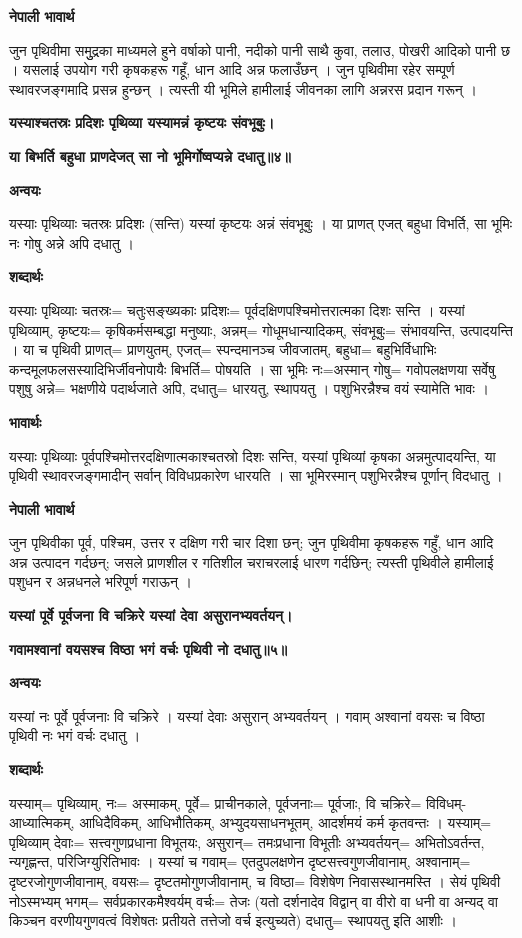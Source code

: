 \documentclass[11pt, a5paper]{article}
\begin{document}
\textbf{नेपाली भावार्थ}

जुन पृथिवीमा समुुद्रका माध्यमले हुने वर्षाको पानी, नदीको पानी साथै कुवा, तलाउ, पोखरी आदिको पानी छ । यसलाई उपयोग गरी कृषकहरू गहूँ, धान आदि अन्न फलाउँछन् । जुन पृथिवीमा रहेर सम्पूर्ण स्थावरजङ्गमादि प्रसन्न हुन्छन् । त्यस्ती यी भूमिले हामीलाई जीवनका लागि अन्नरस प्रदान गरून् ।

\textbf{यस्याश्चतस्रः प्रदिशः पृथिव्या यस्यामन्नं कृष्टयः संवभूबुः।}

\textbf{या बिभर्ति बहुधा प्राणदेजत् सा नो भूमिर्गोष्वप्यन्ने दधातु॥४॥}

\textbf{अन्वयः}

यस्याः पृथिव्याः चतस्रः प्रदिशः (सन्ति) यस्यां कृष्टयः अन्नं संवभूबुः । या प्राणत् एजत् बहुधा विभर्ति, सा भूमिः नः गोषु अन्ने अपि दधातु ।

\textbf{शब्दार्थः}

यस्याः पृथिव्याः चतस्रः= चतुःसङ्‍ख्यकाः प्रदिशः= पूर्वदक्षिणपश्चिमोत्तरात्मका दिशः सन्ति । यस्यां पृथिव्याम्, कृष्टयः= कृषिकर्मसम्बद्धा मनुष्याः, अन्नम्= गोधूमधान्यादिकम्, संवभूबुः= संभावयन्ति, उत्पादयन्ति । या च पृथिवी प्राणत्= प्राणयुतम्, एजत्= स्पन्दमानञ्च जीवजातम्, बहुधा= बहुभिर्विधाभिः कन्दमूलफलसस्यादिभिर्जीवनोपायैः बिभर्ति= पोषयति । सा भूमिः नः=अस्मान् गोषु= गवोपलक्षणया सर्वेषु पशुषु अन्ने= भक्षणीये पदार्थजाते अपि, दधातु= धारयतु, स्थापयतु । पशुभिरन्नैश्च वयं स्यामेति भावः ।

\textbf{भावार्थः}

यस्याः पृथिव्याः पूर्वपश्चिमोत्तरदक्षिणात्मकाश्चतस्रो दिशः सन्ति, यस्यां पृथिव्यां कृषका अन्नमुत्पादयन्ति, या पृथिवी स्थावरजङ्गमादीन् सर्वान् विविधप्रकारेण धारयति । सा भूमिरस्मान् पशुभिरन्नैश्च पूर्णान् विदधातु ।

\textbf{नेपाली भावार्थ}

जुन पृथिवीका पूर्व, पश्चिम, उत्तर र दक्षिण गरी चार दिशा छन्; जुन पृथिवीमा कृषकहरू गहुँ, धान आदि अन्न उत्पादन गर्दछन्; जसले प्राणशील र गतिशील चराचरलाई धारण गर्दछिन्; त्यस्ती पृथिवीले हामीलाई पशुधन र अन्नधनले भरिपूर्ण गराऊन् ।

\textbf{यस्यां पूर्वे पूर्वजना वि चक्रिरे यस्यां देवा असुरानभ्यवर्तयन्।}

\textbf{गवामश्वानां वयसश्च विष्ठा भगं वर्चः पृथिवी नो दधातु॥५॥}

\textbf{अन्वयः}

यस्यां नः पूर्वे पूर्वजनाः वि चक्रिरे  । यस्यां देवाः असुरान् अभ्यवर्तयन् । गवाम् अश्वानां वयसः च विष्ठा पृथिवी नः भगं वर्चः दधातु ।

\textbf{शब्दार्थः}

यस्याम्= पृथिव्याम्, नः= अस्माकम्, पूर्वे= प्राचीनकाले, पूर्वजनाः= पूर्वजाः, वि चक्रिरे= विविधम्- आध्यात्मिकम्, आधिदैविकम्, आधिभौतिकम्, अभ्युदयसाधनभूतम्, आदर्शमयं कर्म कृतवन्तः । यस्याम्= पृथिव्याम् देवाः= सत्त्वगुणप्रधाना विभूतयः, असुरान्= तमःप्रधाना विभूतीः  अभ्यवर्तयन्= अभितोऽवर्तन्त, न्यगृह्णन्त, परिजिग्युरितिभावः । यस्यां च गवाम्= एतदुपलक्षणेन दृष्टसत्त्वगुणजीवानाम्, अश्वानाम्= दृष्टरजोगुणजीवानाम्, वयसः= दृष्टतमोगुणजीवानाम्, च विष्ठा= विशेषेण निवासस्थानमस्ति । सेयं पृथिवी नोऽस्मभ्यम् भगम्= सर्वप्रकारकमैश्वर्यम् वर्चः= तेजः (यतो दर्शनादेव विद्वान् वा वीरो वा धनी वा अन्यद् वा किञ्चन वरणीयगुणवत्वं विशेषतः प्रतीयते तत्तेजो वर्च इत्युच्यते) दधातु= स्थापयतु इति आशीः ।
\end{document}
